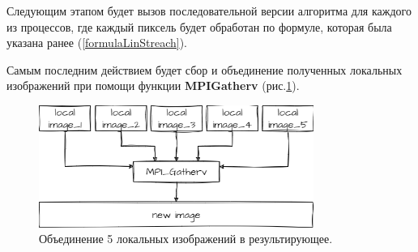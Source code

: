 \vspace{5mm}

Следующим этапом будет вызов последовательной версии алгоритма для каждого из процессов, где каждый пиксель будет обработан по формуле, которая была указана ранее (\ref{formulaLinStreach}).

\vspace{2cm}

Самым последним действием будет сбор и объединение полученных локальных изображений при помощи функции \textbf{MPI\textunderscore Gatherv} (рис.\ref{fig:gatherv}).

\vspace{5mm}

\begin{figure}[h!]
\centering
\includegraphics[width=0.8\textwidth]{images/gatherv.png}
\caption{Объединение 5 локальных изображений в результирующее.}
\label{fig:gatherv}
\end{figure}
